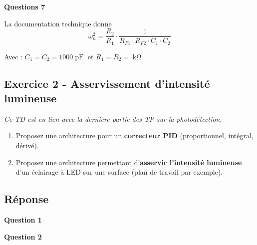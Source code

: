 \medskip

\textbf{Questions 7}

La documentation technique donne $$\omega_n^2 = \frac{R_2}{R_1} \cdot \frac{1}{R_{F1} \cdot R_{F2} \cdot C_1 \cdot C_2}$$

Avec : $C_1 = C_2 = 1000\operatorname{pF}$ et $R_1 = R_2 = \operatorname{k\Omega}$

\newpage
\subsection{Exercice 2 - Asservissement d'intensité lumineuse}

\textit{Ce TD est en lien avec la dernière partie des TP sur la photodétection.}

\begin{enumerate}
	\item Proposez une architecture pour un \textbf{correcteur PID} (proportionnel, intégral, dérivé).
	\item Proposez une architecture permettant d'\textbf{asservir l'intensité lumineuse} d'un éclairage à LED sur une surface (plan de travail par exemple).
\end{enumerate}


\subsection*{Réponse}

\textbf{Question 1}

\begin{center}
\end{center}




\textbf{Question 2}

\begin{center}
{\Large
{}
}
\end{center}





